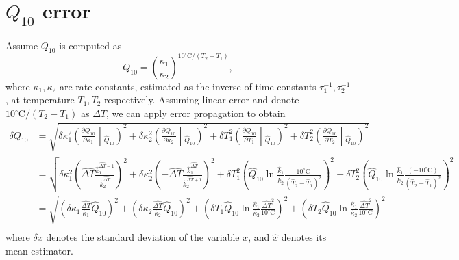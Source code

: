 \documentclass[a4paper,12pt]{article}
\begin{document}
\section*{$Q_{10}$ error}
Assume $Q_{10}$ is computed as
\begin{equation}
    Q_{10} = \left(\frac{\kappa_1}{\kappa_2}\right) ^ {10^\circ\text{C} / (T_2 - T_1)},
\end{equation}
where $\kappa_1, \kappa_2$ are rate constants, estimated as the inverse of time constants $\tau_1^{-1}, \tau_2^{-1}$, at temperature $T_1, T_2$ respectively.
Assuming linear error and denote $10^\circ\text{C} / (T_2 - T_1)$ as $\Delta T$, we can apply error propagation to obtain
\begin{align*}
    \delta Q_{10} &= \sqrt{
        \delta \kappa_1 ^ 2 \left(\frac{\partial Q_{10}}{\partial \kappa_1} \middle|_{\hat{Q}_{10}}\right) ^ 2
        + \delta \kappa_2 ^ 2 \left(\frac{\partial Q_{10}}{\partial \kappa_2} \middle|_{\hat{Q}_{10}}\right) ^ 2
        + \delta T_1 ^ 2 \left(\frac{\partial Q_{10}}{\partial T_1} \middle|_{\hat{Q}_{10}}\right) ^ 2
        + \delta T_2 ^ 2 \left(\frac{\partial Q_{10}}{\partial T_2} \middle|_{\hat{Q}_{10}}\right) ^ 2} \\
                  &= \sqrt{
        \delta \kappa_1 ^ 2 \left(\hat{\Delta T} \frac{\hat{k}_1 ^ {\hat{\Delta T} - 1}}{\hat{k}_2 ^ {\hat{\Delta T}}}\right) ^ 2
        + \delta \kappa_2 ^ 2 \left(-\hat{\Delta T} \frac{\hat{k}_1 ^ {\hat{\Delta T}}}{\hat{k}_2 ^ {\hat{\Delta T} + 1}}\right) ^ 2
        + \delta T_1 ^ 2 \left(\hat{Q}_{10} \ln\frac{\hat{k}_1}{\hat{k}_2} \frac{10^\circ\text{C}}{(\hat{T}_2 - \hat{T}_1) ^ 2}\right) ^ 2
        + \delta T_2 ^ 2 \left(\hat{Q}_{10} \ln\frac{\hat{k}_1}{\hat{k}_2} \frac{(-10^\circ\text{C})}{(\hat{T}_2 - \hat{T}_1) ^ 2}\right) ^ 2} \\
                  &= \sqrt{
        \left(\delta \kappa_1 \frac{\hat{\Delta T}}{\hat{\kappa}_1} \hat{Q}_{10}\right) ^ 2
        + \left(\delta \kappa_2 \frac{\hat{\Delta T}}{\hat{\kappa}_2} \hat{Q}_{10}\right) ^ 2
        + \left(\delta T_1 \hat{Q}_{10} \ln\frac{\hat{\kappa}_1}{\hat{\kappa}_2} \frac{\hat{\Delta T} ^ 2}{10^\circ\text{C}}\right) ^ 2
        + \left(\delta T_2 \hat{Q}_{10} \ln\frac{\hat{\kappa}_1}{\hat{\kappa}_2} \frac{\hat{\Delta T} ^ 2}{10^\circ\text{C}}\right) ^ 2} \\
\end{align*}
where $\delta x$ denotes the standard deviation of the variable $x$, and $\hat{x}$ denotes its mean estimator.
\end{document}
